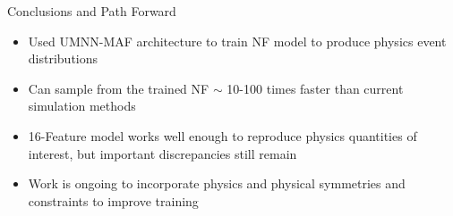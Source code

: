\documentclass[aspectratio=169]{beamer}
\begin{document}
\begin{frame}{Conclusions and Path Forward}
    \begin{itemize}
        \item Used UMNN-MAF architecture to train NF model to produce physics event distributions
        \item Can sample from the trained NF $\sim$ 10-100 times faster than current simulation methods
        \item 16-Feature model works well enough to reproduce physics quantities of interest, but important discrepancies still remain
        \item Work is ongoing to incorporate physics and physical symmetries and constraints to improve training
    \end{itemize}
\end{frame}

\end{document}
